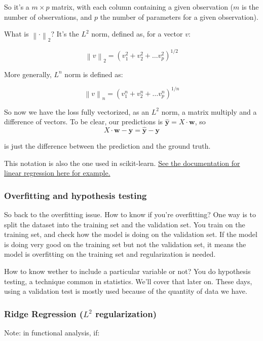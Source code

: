\documentclass{article}
\theoremstyle{problemstyle}
\begin{document}
So it's a $m \times p$ matrix, with each column containing a given observation ($m$ is the number of observations, and $p$ the number of parameters for a given observation). 

What is $ \left\lVert \cdot \right\rVert _2 $? It's the $L^2$ norm, defined as, for a vector $v$:

\[
  \left\lVert v \right\rVert_2 = (v_1 ^2 + v_2^2 + \dots v_p^2) ^{1/2}
\]

More generally, $L^n$ norm is defined as:


\[
  \left\lVert v \right\rVert_n = (v_1 ^n + v_2^n + \dots v_p^n) ^{1/n}
\]

So now we have the loss fully vectorized, as an $L^2$ norm, a matrix multiply and a difference of vectors. To be clear, our predictions is $\hat{\textbf{y}} = X \cdot \textbf{w}$, so 
\[
  X \cdot \textbf{w} - \textbf{y} = \hat{\textbf{y}}- \textbf{y}
\]

is just the difference between the prediction and the ground truth. 

This notation is also the one used in scikit-learn. \href{https://scikit-learn.org/stable/modules/linear_model.html#ordinary-least-squares}{See the documentation for linear regression here for example.}

\subsubsection{Overfitting and hypothesis testing}

So back to the overfitting issue. How to know if you're overfitting?
One way is to split the dataset into the training set and the validation set. You train on the training set, and check how the model is doing on the validation set. If the model is doing very good on the training set but not the validation set, it means the model is overfitting on the training set and regularization is needed. 

How to know wether to include a particular variable or not? You do hypothesis testing, a technique common in statistics. We'll cover that later on. These days, using a validation test is mostly used because of the quantity of data we have. 

\subsubsection{Ridge Regression ($L^2$ regularization)}

Note: in functional analysis, if:
\end{document}
